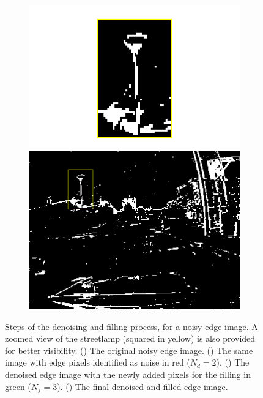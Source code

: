 \begin{figure}[t]
\begin{subfigure}{0.225\linewidth}
    \includegraphics[width=\linewidth]{mainmatter/figures/3_optical_flow/denoising_filling/output.png}
    \caption{}\label{subfig:ebof:denoising_filling:out}
  \end{subfigure}
  \caption{Steps of the denoising and filling process, for a noisy edge image. A zoomed view of the streetlamp (squared in yellow) is also provided for better visibility. () The original noisy edge image. () The same image with edge pixels identified as noise in red (\(N_d = 2\)). () The denoised edge image with the newly added pixels for the filling in green (\(N_f = 3\)). () The final denoised and filled edge image.}\label{fig:ebof:denoising_filling}
\end{figure}

